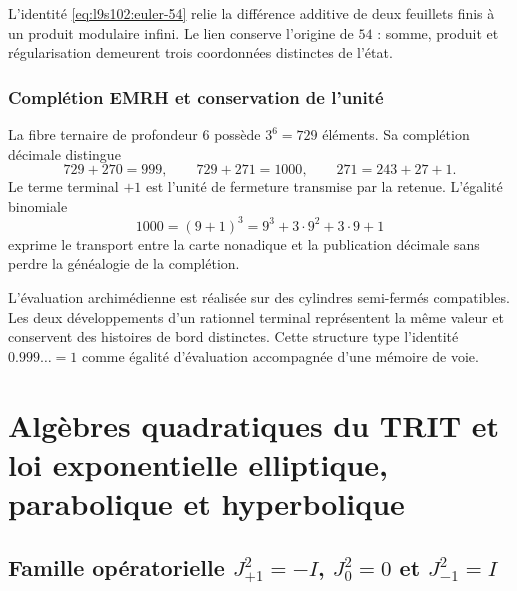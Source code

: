 L'identité \cref{eq:l9s102:euler-54} relie la différence additive de deux
feuillets finis à un produit modulaire infini. Le lien conserve
l'origine de \(54\) : somme, produit et régularisation demeurent trois
coordonnées distinctes de l'état.

\subsubsection{Complétion EMRH et conservation de l'unité}
\label{sec:l9s102:euler-emrh}

La fibre ternaire de profondeur \(6\) possède \(3^6=729\) éléments. Sa
complétion décimale distingue
\begin{equation}
 729+270=999,
 \qquad
 729+271=1000,
 \qquad
 271=243+27+1.
 \label{eq:l9s102:euler-729-1000}
\end{equation}
Le terme terminal \(+1\) est l'unité de fermeture transmise par la
retenue. L'égalité binomiale
\begin{equation}
 1000=(9+1)^3=9^3+3\cdot9^2+3\cdot9+1
 \label{eq:l9s102:euler-binomial-1000}
\end{equation}
exprime le transport entre la carte nonadique et la publication décimale sans
perdre la généalogie de la complétion.

L'évaluation archimédienne est réalisée sur des cylindres semi-fermés
compatibles. Les deux développements d'un rationnel terminal représentent la
même valeur et conservent des histoires de bord distinctes. Cette structure
type l'identité \(0.999\ldots=1\) comme égalité d'évaluation accompagnée
d'une mémoire de voie.

\section{Algèbres quadratiques du TRIT et loi exponentielle elliptique, parabolique et hyperbolique}
\label{sec:l9s102:euler-algebras-trit}

\subsection{Famille opératorielle \texorpdfstring{\(J_{+1}^2=-I\), \(J_0^2=0\) et \(J_{-1}^2=I\)}{J+1^2=-I, J0^2=0 et J-1^2=I}}


